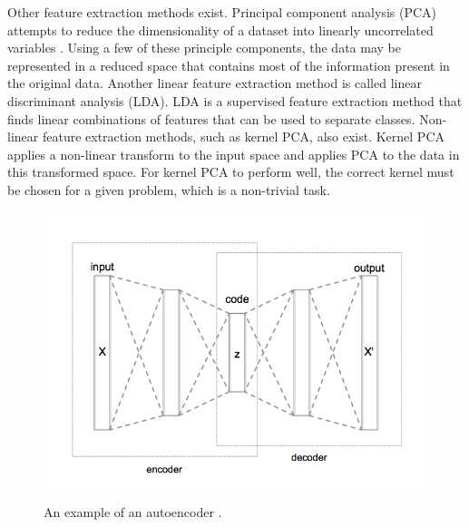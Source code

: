 
Other feature extraction methods exist. Principal component analysis (PCA) attempts to reduce the dimensionality of a dataset into linearly uncorrelated variables \cite{Jolliffe2002}. Using a few of these principle components, the data may be represented in a reduced space that contains most of the information present in the original data. Another linear feature extraction method is called linear discriminant analysis (LDA). LDA is a supervised feature extraction method that finds linear combinations of features that can be used to separate classes. Non-linear feature extraction methods, such as kernel PCA, also exist. Kernel PCA applies a non-linear transform to the input space and applies PCA to the data in this transformed space. For kernel PCA to perform well, the correct kernel must be chosen for a given problem, which is a non-trivial task.






\begin{figure}[H]
\centering
\includegraphics[width=0.8\linewidth]{images/Autoencoder_structure}
\caption{An example of an autoencoder \cite{wiki:AutoencoderStructure}.}
\label{fig:Autoencoder_structure}
\end{figure}



